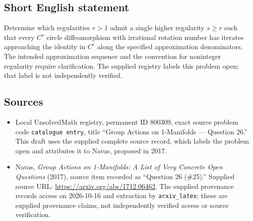 \documentclass[11pt]{article}
\begin{document}
\subsection{Short English statement}
Determine which regularities \(r>1\) admit a single higher regularity \(s\ge r\) such that every \(C^s\) circle diffeomorphism with irrational rotation number has iterates approaching the identity in \(C^r\) along the specified approximation denominators. The intended approximation sequence and the convention for noninteger regularity require clarification. The supplied registry labels this problem open; that label is not independently verified.
\subsection{Sources}
\begin{itemize}
\item Local UnsolvedMath registry, permanent ID \(800309\), exact source problem code \texttt{catalogue entry}, title ``Group Actions on 1-Manifolds --- Question 26.'' This draft uses the supplied complete source record, which labels the problem open and attributes it to Navas, proposed in 2017.
\item Navas, \emph{Group Actions on 1-Manifolds: A List of Very Concrete Open Questions} (2017), source item recorded as ``Question 26 (\#25).'' Supplied source URL: \url{https://arxiv.org/abs/1712.06462}. The supplied provenance records access on 2026-10-16 and extraction by \texttt{arxiv\_latex}; these are supplied provenance claims, not independently verified access or source verification.
\end{itemize}
\end{document}
